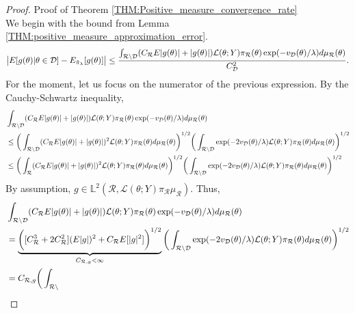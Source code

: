 \documentclass[10pt,fleqn]{article} \pdfoutput=1
\DeclareMathOperator{\1}{\mathbbm{1}} \DeclareMathOperator{\bigO}{\mc O}
\begin{document}
\begin{proof}{Proof of Theorem \ref{THM:Positive_measure_convergence_rate}}
	\\

	We begin with the bound from Lemma
	\ref{THM:positive_measure_approximation_error}.  $$\big|
		E[g(\theta)|\theta\in\mathcal{D}]-E_{\tilde{\pi}_\lambda}[g(\theta)]\big|
		\le \frac{\int_{\mathcal{R}\setminus \mathcal{D}}
		(C_\mathcal{R}E|g(\theta)|+|g(\theta)|)
		\mathcal{L}(\theta;Y)\pi_\mathcal{R}(\theta)\exp(-v_{\mathcal{D}}(\theta)/\lambda )
		d\mu_\mathcal{R}(\theta)}{C_\mathcal{D}^2 }.$$ For the moment, let us focus
	on the numerator of the previous expression.  By the Cauchy-Schwartz
	inequality, \begin{align*}  & \int_{\mathcal{R}\setminus \mathcal{D}}
		(C_\mathcal{R}E|g(\theta)|+|g(\theta)|)
		\mathcal{L}(\theta;Y)\pi_\mathcal{R}(\theta)\exp(-v_{\mathcal{D}}(\theta)/\lambda
		) d\mu_\mathcal{R}(\theta)                 \\ &\le \bigg(\int_{\mathcal{R}\setminus
		\mathcal{D}}   (C_\mathcal{R}E|g(\theta)|+|g(\theta)|)^2
		\mathcal{L}(\theta;Y)\pi_\mathcal{R}(\theta)d\mu_\mathcal{R}(\theta)\bigg)^{1/2}
		\bigg(\int_{\mathcal{R}\setminus \mathcal{D}}\exp(-2v_{\mathcal{D}}(\theta)/\lambda
		)\mathcal{L}(\theta;Y)\pi_\mathcal{R}(\theta)
		d\mu_\mathcal{R}(\theta)\bigg)^{1/2}       \\ &\le \bigg(\int_{\mathcal{R}}
		(C_\mathcal{R}E|g(\theta)|+|g(\theta)|)^2
		\mathcal{L}(\theta;Y)\pi_\mathcal{R}(\theta)d\mu_\mathcal{R}(\theta)\bigg)^{1/2}
		\bigg(\int_{\mathcal{R}\setminus \mathcal{D}}\exp(-2v_{\mathcal{D}}(\theta)/\lambda
		)\mathcal{L}(\theta;Y)\pi_\mathcal{R}(\theta)
		d\mu_\mathcal{R}(\theta)\bigg)^{1/2}\end{align*} By assumption,
	$g\in\mathbb{L}^2(\mathcal{R},\mathcal{L}(\theta;Y)\pi_\mathcal{R}\mu_\mathcal{R}).$
	Thus, \begin{align*}  & \int_{\mathcal{R}\setminus \mathcal{D}}
		(C_\mathcal{R}E|g(\theta)|+|g(\theta)|)
		\mathcal{L}(\theta;Y)\pi_\mathcal{R}(\theta)\exp(-v_{\mathcal{D}}(\theta)/\lambda
		) d\mu_\mathcal{R}(\theta)                                         \\
		 & =\underbrace{\bigg([C_\mathcal{R}^3+2C_\mathcal{R}^2](E|g|)^2 +
		C_\mathcal{R}E[|g|^2]
		\bigg)^{1/2}}_{C_{\mathcal{R},g}<\infty}\bigg(\int_{\mathcal{R}\setminus
			\mathcal{D}}\exp(-2v_{\mathcal{D}}(\theta)/\lambda
		)\mathcal{L}(\theta;Y)\pi_\mathcal{R}(\theta)
		d\mu_\mathcal{R}(\theta)\bigg)^{1/2}                               \\
		 & =C_{\mathcal{R},g}\bigg(\int_{\mathcal{R}\setminus
}
\end{align*}
\end{proof}
\end{document}

